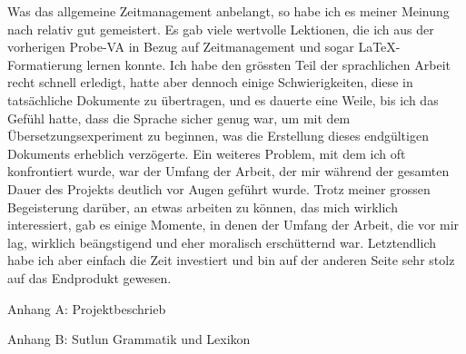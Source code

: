 \documentclass{article}
\begin{document}
Was das allgemeine Zeitmanagement anbelangt, so habe ich es meiner Meinung nach relativ gut gemeistert.
Es gab viele wertvolle Lektionen, die ich aus der vorherigen Probe-VA in Bezug auf Zeitmanagement
und sogar \LaTeX-Formatierung lernen konnte. Ich habe den grössten Teil der sprachlichen Arbeit recht
schnell erledigt, hatte aber dennoch einige Schwierigkeiten, diese in tatsächliche Dokumente zu übertragen,
und es dauerte eine Weile, bis ich das Gefühl hatte, dass die Sprache sicher genug war,
um mit dem Übersetzungsexperiment zu beginnen, was die Erstellung dieses endgültigen Dokuments erheblich verzögerte.
Ein weiteres Problem, mit dem ich oft konfrontiert wurde, war der Umfang der Arbeit,
der mir während der gesamten Dauer des Projekts deutlich vor Augen geführt wurde.
Trotz meiner grossen Begeisterung darüber, an etwas arbeiten zu können, das mich wirklich interessiert,
gab es einige Momente, in denen der Umfang der Arbeit, die vor mir lag, wirklich beängstigend und eher
moralisch erschütternd war. Letztendlich habe ich aber einfach die Zeit investiert und bin auf der anderen
Seite sehr stolz auf das Endprodukt gewesen.







\renewcommand{\section}[1]{\newpage\vspace*{\fill}\Huge{#1}\vspace*{\fill}}


\section{Anhang A: Projektbeschrieb}


\section{Anhang B: Sutlun Grammatik und Lexikon}

\end{document}
